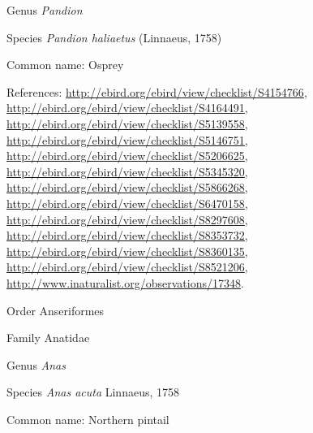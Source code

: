\documentclass[9pt, article]{memoir}
\begin{document}
\begin{multicols}{2}
\vspace{6pt}\noindent\hspace{30pt}Genus \textit{Pandion}


\vspace{6pt}\noindent\hspace{36pt}Species \textit{Pandion haliaetus} (Linnaeus, 1758)


Common name: Osprey

References: 
\url{http://ebird.org/ebird/view/checklist/S4154766}, 
\url{http://ebird.org/ebird/view/checklist/S4164491}, 
\url{http://ebird.org/ebird/view/checklist/S5139558}, 
\url{http://ebird.org/ebird/view/checklist/S5146751}, 
\url{http://ebird.org/ebird/view/checklist/S5206625}, 
\url{http://ebird.org/ebird/view/checklist/S5345320}, 
\url{http://ebird.org/ebird/view/checklist/S5866268}, 
\url{http://ebird.org/ebird/view/checklist/S6470158}, 
\url{http://ebird.org/ebird/view/checklist/S8297608}, 
\url{http://ebird.org/ebird/view/checklist/S8353732}, 
\url{http://ebird.org/ebird/view/checklist/S8360135}, 
\url{http://ebird.org/ebird/view/checklist/S8521206}, 
\url{http://www.inaturalist.org/observations/17348}.

\vspace{6pt}\noindent\hspace{18pt}Order Anseriformes


\vspace{6pt}\noindent\hspace{24pt}Family Anatidae


\vspace{6pt}\noindent\hspace{30pt}Genus \textit{Anas}


\vspace{6pt}\noindent\hspace{36pt}Species \textit{Anas acuta} Linnaeus, 1758


Common name: Northern pintail


\end{multicols}
\end{document}

